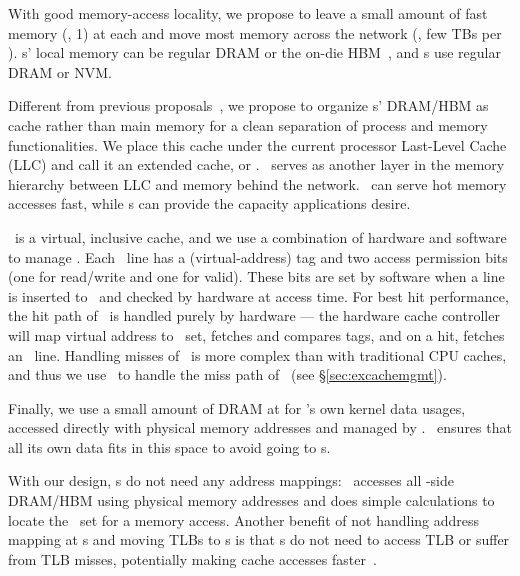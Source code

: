 \documentclass[10pt,times,twocolumn]{z2-article}
\begin{document}
{{{{{{{With good memory-access locality, we propose to %
leave a small amount of fast memory (\eg, 1\GB) at each \pcomponent{}
and move most memory across the network (\eg, few TBs per \mcomponent{}).
\pcomponent{}s' local memory can be regular DRAM 
or the on-die HBM~\cite{HBM-JEDEC,Knights-Landing},
and \mcomponent{}s use regular DRAM or NVM.

Different from previous proposals~\cite{Lim09-disaggregate}, 
we propose to organize \pcomponent{}s' DRAM/HBM as cache rather than main memory
for a clean separation of process and memory functionalities.
We place this cache under the current processor Last-Level Cache (LLC)
and call it an extended cache, or {\em \excache}.
\excache\ serves as another layer in the memory hierarchy between LLC and memory behind the network.
\excache\ can serve hot memory accesses fast, while \mcomponent{}s can provide the capacity applications desire. 

\excache\ is a virtual, inclusive cache,
and we use a combination of hardware and software to manage \excache.
Each \excache\ line has a (virtual-address) tag and two access permission bits (one for read/write and one for valid).
These bits are set by software when a line is inserted to \excache\ and checked by hardware at access time.
For best hit performance, the hit path of \excache\ is handled purely by hardware
--- the hardware cache controller will map virtual address to \excache\ set, 
fetches and compares tags, and on a hit, fetches an \excache\ line.
Handling misses of \excache\ is more complex than with traditional CPU caches, 
and thus we use \lego\ to handle the miss path of \excache\ (see \S\ref{sec:excachemgmt}).

Finally, we use a small amount of DRAM at \pcomponent{} for \lego's own kernel data usages,
accessed directly with physical memory addresses and managed by \lego. 
\lego\ ensures that all its own data fits in this space to avoid going to \mcomponent{}s.

With our design, \pcomponent{}s do not need any address mappings:
\lego\ accesses all \pcomponent{}-side DRAM/HBM using physical memory addresses
and does simple calculations to locate the \excache\ set for a memory access.
Another benefit of not handling address mapping at \pcomponent{}s and moving TLBs to \mcomponent{}s 
is that \pcomponent{}s do not need to access TLB or suffer from TLB misses,
potentially making \pcomponent{} cache accesses faster~\cite{Kaxiras-ISCA13}.

}}}}}}}
\end{document}
